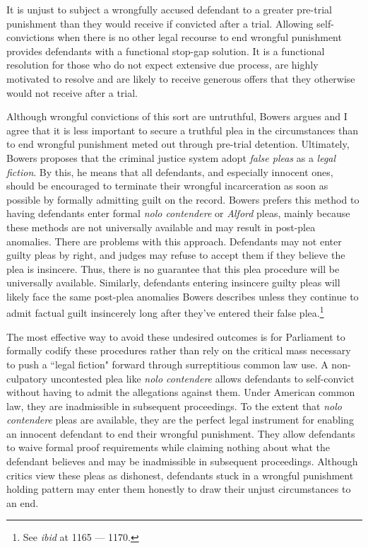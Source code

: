 It is unjust to subject a wrongfully accused defendant to a greater pre-trial punishment than they would receive if convicted after a trial. Allowing self-convictions when there is no other legal recourse to end wrongful punishment provides defendants with a functional stop-gap solution. It is a functional resolution for those who do not expect extensive due process, are highly motivated to resolve and are likely to receive generous offers that they otherwise would not receive after a trial. 

Although wrongful convictions of this sort are untruthful, Bowers argues and I agree that it is less important to secure a truthful plea in the circumstances than to end wrongful punishment meted out through pre-trial detention. Ultimately, Bowers proposes that the criminal justice system adopt \textit{false pleas} as a \textit{legal fiction}. By this, he means that all defendants, and especially innocent ones, should be encouraged to terminate their wrongful incarceration as soon as possible by formally admitting guilt on the record. Bowers prefers this method to having defendants enter formal \textit{nolo contendere} or \textit{Alford} pleas, mainly because these methods are not universally available and may result in post-plea anomalies. There are problems with this approach. Defendants may not enter guilty pleas by right, and judges may refuse to accept them if they believe the plea is insincere. Thus, there is no guarantee that this plea procedure will be universally available. Similarly, defendants entering insincere guilty pleas will likely face the same post-plea anomalies Bowers describes unless they continue to admit factual guilt insincerely long after they've entered their false plea.\footnote{See \textit{ibid} at 1165 — 1170.} 

The most effective way to avoid these undesired outcomes is for Parliament to formally codify these procedures rather than rely on the critical mass necessary to push a ``legal fiction" forward through surreptitious common law use. A non-culpatory uncontested plea like \textit{nolo contendere} allows defendants to self-convict without having to admit the allegations against them. Under American common law, they are inadmissible in subsequent proceedings. To the extent that \textit{nolo contendere} pleas are available, they are the perfect legal instrument for enabling an innocent defendant to end their wrongful punishment. They allow defendants to waive formal proof requirements while claiming nothing about what the defendant believes and may be inadmissible in subsequent proceedings. Although critics view these pleas as dishonest, defendants stuck in a wrongful punishment holding pattern may enter them honestly to draw their unjust circumstances to an end.

